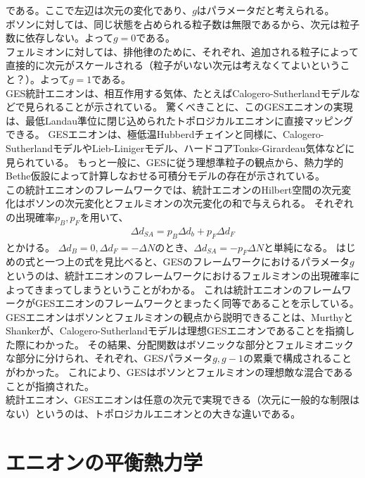 \documentclass[a4paper,11pt]{jsarticle}
\begin{document}
である。ここで左辺は次元の変化であり、$g$はパラメータだと考えられる。\\
ボソンに対しては、同じ状態を占められる粒子数は無限であるから、次元は粒子数に依存しない。よって$g=0$である。\\
フェルミオンに対しては、排他律のために、それぞれ、追加される粒子によって直接的に次元がスケールされる（粒子がいない次元は考えなくてよいということ？）。よって$g=1$である。\\
GES統計エニオンは、相互作用する気体、たとえばCalogero-Sutherlandモデルなどで見られることが示されている。
驚くべきことに、このGESエニオンの実現は、最低Landau準位に閉じ込められたトポロジカルエニオンに直接マッピングできる。
GESエニオンは、極低温Hubberdチェインと同様に、Calogero-SutherlandモデルやLieb-Linigerモデル、ハードコアTonks-Girardeau気体などに見られている。
もっと一般に、GESに従う理想準粒子の観点から、熱力学的Bethe仮設によって計算しなおせる可積分モデルの存在が示されている。\\
この統計エニオンのフレームワークでは、統計エニオンのHilbert空間の次元変化はボソンの次元変化とフェルミオンの次元変化の和で与えられる。
それぞれの出現確率$p_B,p_F$を用いて、
\begin{align}
\Delta d_{SA}=p_B\Delta d_b+p_F\Delta d_F
\end{align}
とかける。
$\Delta d_B=0,\Delta d_F=-\Delta N$のとき、$\Delta d_{SA}=-p_F\Delta N$と単純になる。
はじめの式と一つ上の式を見比べると、GESのフレームワークにおけるパラメータ$g$というのは、統計エニオンのフレームワークにおけるフェルミオンの出現確率によってきまってしまうということがわかる。
これは統計エニオンのフレームワークがGESエニオンのフレームワークとまったく同等であることを示している。
GESエニオンはボソンとフェルミオンの観点から説明できることは、MurthyとShankerが、Calogero-Sutherlandモデルは理想GESエニオンであることを指摘した際にわかった。
その結果、分配関数はボソニックな部分とフェルミオニックな部分に分けられ、それぞれ、GESパラメータ$g,g-1$の累乗で構成されることがわかった。
これにより、GESはボソンとフェルミオンの理想敵な混合であることが指摘された。\\
統計エニオン、GESエニオンは任意の次元で実現できる（次元に一般的な制限はない）というのは、トポロジカルエニオンとの大きな違いである。


\section{エニオンの平衡熱力学}
\end{document}
